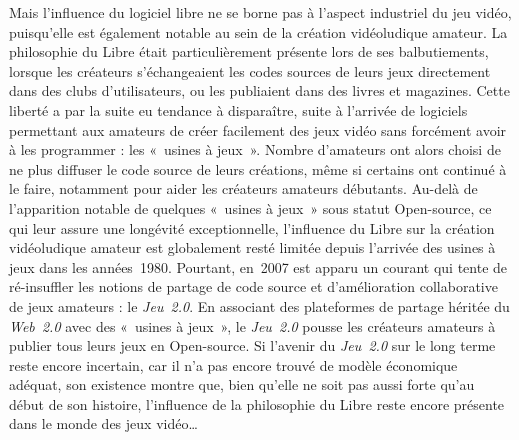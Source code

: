 \documentclass{FramateX}
\begin{document}
\begin{refsection}
Mais l'influence du logiciel libre ne se borne pas à l'aspect industriel
du jeu vidéo, puisqu'elle est également notable au sein de la création
vidéoludique amateur. La philosophie du Libre était particulièrement
présente lors de ses balbutiements, lorsque les créateurs
s'échangeaient les codes sources de leurs jeux directement dans des
clubs d'utilisateurs, ou les publiaient dans des livres et magazines.
Cette liberté a par la suite eu tendance à disparaître, suite à
l'arrivée de logiciels permettant aux amateurs de créer facilement des
jeux vidéo sans forcément avoir à les programmer : les «~usines à
jeux~». Nombre d'amateurs ont alors choisi de ne plus diffuser le code
source de leurs créations, même si certains ont continué à le faire,
notamment pour aider les créateurs amateurs débutants. Au-delà de
l'apparition notable de quelques «~usines à jeux~» sous statut
Open-source, ce qui leur assure une longévité exceptionnelle,
l'influence du Libre sur la création vidéoludique amateur est
globalement resté limitée depuis l'arrivée des usines à jeux dans les
années~1980. Pourtant, en~2007 est apparu un courant qui tente de
ré-insuffler les notions de partage de code source et d'amélioration
collaborative de jeux amateurs : le
\textit{Jeu~2.0}. En associant des
plateformes de partage héritée du
\textit{Web~2.0} avec des «~usines à jeux~»,
le \textit{Jeu~2.0} pousse les créateurs
amateurs à publier tous leurs jeux en Open-source. Si l'avenir du
\textit{Jeu~2.0} sur le long terme reste
encore incertain, car il n'a pas encore trouvé de modèle économique
adéquat, son existence montre que, bien qu'elle ne soit pas aussi forte
qu'au début de son histoire, l'influence de la philosophie du Libre
reste encore présente dans le monde des jeux vidéo…




\end{refsection}
\end{document}
